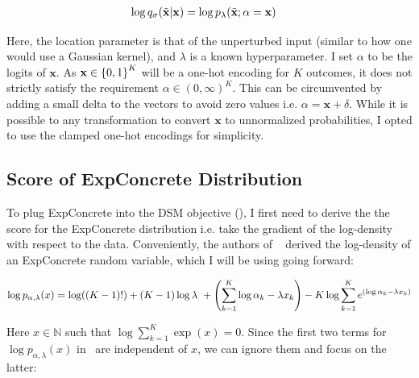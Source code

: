 \begin{align*}
     \log q_{\sigma}(\Tilde{\mathbf{x}} | \mathbf{x})  &= \log p_{\lambda}(\Tilde{\mathbf{x}}; \alpha=\mathbf{x})
\end{align*}

Here, the location parameter is that of the unperturbed input (similar to how one would use a Gaussian kernel), and $\lambda$ is a known hyperparameter. I set $\alpha$ to be the logits of $\mathbf{x}$. As $\mathbf{x} \in \left\{ {0,1} \right\}^K$ will be a one-hot encoding for $K$ outcomes, it does not strictly satisfy the requirement $\alpha \in (0, \infty)^K$. This can be circumvented by adding a small delta to the vectors to avoid zero values i.e. $\alpha = \mathbf{x} + \delta $. While it is possible to any transformation to convert $\mathbf{x}$ to unnormalized probabilities, I opted to use the clamped one-hot encodings for simplicity.

\subsection*{Score of ExpConcrete Distribution}

To plug ExpConcrete into the DSM objective (), I first need to derive the the score for the ExpConcrete distribution i.e. take the gradient of the log-density with respect to the data. Conveniently, the authors of ~\cite{maddison2017concrete} derived the log-density of an ExpConcrete random variable, which I will be using going forward:

\begin{equation}
    \label{eq:concrete_log_pdf}
         \log p_{\alpha, \lambda}(x) = \log((K-1)!) + (K-1) \log \lambda~ + \left( { \sum_{k=1}^{K} \log \alpha_k - \lambda x_k } \right) -
         K\log \sum_{k=1}^{K} e^{(\log \alpha_k - \lambda x_k)}
\end{equation}

Here $x \in \mathbb{N} $ such that $ \log \sum_{k=1}^{K} \exp (x) = 0$. Since the first two terms for $\log p_{\alpha, \lambda}(x)$ in~ are independent of $x$, we can ignore them and focus on the latter:

